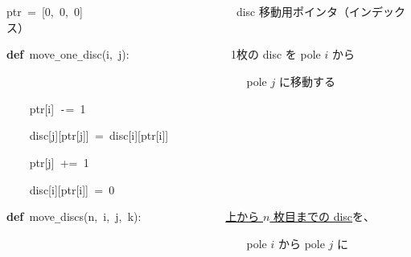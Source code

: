\documentclass[a4paper,10pt]{article}
\def\mc{\relax}
\begin{document}
\noindent
\mbox{}\hfill

\noindent
\mbox{}ptr{\tt\mc \ }={\tt\mc \ }[0,{\tt\mc \ }0,{\tt\mc \ }0]{\tt\mc \ }{\tt\mc \ }{\tt\mc \ }{\tt\mc \ }{\tt\mc \ }{\tt\mc \ }{\tt\mc \ }{\tt\mc \ }{\tt\mc \ }{\tt\mc \ }{\tt\mc \ }{\tt\mc \ }{\tt\mc \ }{\tt\mc \ }{\tt\mc \ }{\tt\mc \ }{\tt\mc \ }{\tt\mc \ }{\tt\mc \ }{\tt\mc \ }{\tt\mc \ }{\tt\mc \ }{\tt\mc \ }{\tt\mc \ }{\tt\mc \ }\rm\mc {\tt\#} \ disc 移動用ポインタ（インデックス）\hfill 
\tt\mc 

\noindent
\mbox{}\hfill

\noindent
\mbox{}\textbf{def}{\tt\mc \ }move{\tt\_}one{\tt\_}disc(i,{\tt\mc \ }j):{\tt\mc \ }{\tt\mc \ }{\tt\mc \ }{\tt\mc \ }{\tt\mc \ }{\tt\mc \ }{\tt\mc \ }{\tt\mc \ }{\tt\mc \ }{\tt\mc \ }{\tt\mc \ }{\tt\mc \ }{\tt\mc \ }{\tt\mc \ }{\tt\mc \ }{\tt\mc \ }\rm\mc {\tt\#} \ 1枚の disc を pole $i$ から\hfill 
\tt\mc 

\noindent
\mbox{}{\tt\mc \ }{\tt\mc \ }{\tt\mc \ }{\tt\mc \ }{\tt\mc \ }{\tt\mc \ }{\tt\mc \ }{\tt\mc \ }{\tt\mc \ }{\tt\mc \ }{\tt\mc \ }{\tt\mc \ }{\tt\mc \ }{\tt\mc \ }{\tt\mc \ }{\tt\mc \ }{\tt\mc \ }{\tt\mc \ }{\tt\mc \ }{\tt\mc \ }{\tt\mc \ }{\tt\mc \ }{\tt\mc \ }{\tt\mc \ }{\tt\mc \ }{\tt\mc \ }{\tt\mc \ }{\tt\mc \ }{\tt\mc \ }{\tt\mc \ }{\tt\mc \ }{\tt\mc \ }{\tt\mc \ }{\tt\mc \ }{\tt\mc \ }{\tt\mc \ }{\tt\mc \ }{\tt\mc \ }{\tt\mc \ }{\tt\mc \ }\rm\mc {\tt\#} \ pole $j$ に移動する \hfill 
\tt\mc 

\noindent
\mbox{}{\tt\mc \ }{\tt\mc \ }{\tt\mc \ }{\tt\mc \ }ptr[i]{\tt\mc \ }{\tt -}={\tt\mc \ }1

\noindent
\mbox{}{\tt\mc \ }{\tt\mc \ }{\tt\mc \ }{\tt\mc \ }disc[j][ptr[j]]{\tt\mc \ }={\tt\mc \ }disc[i][ptr[i]]

\noindent
\mbox{}{\tt\mc \ }{\tt\mc \ }{\tt\mc \ }{\tt\mc \ }ptr[j]{\tt\mc \ }+={\tt\mc \ }1

\noindent
\mbox{}{\tt\mc \ }{\tt\mc \ }{\tt\mc \ }{\tt\mc \ }disc[i][ptr[i]]{\tt\mc \ }={\tt\mc \ }0

\noindent
\mbox{}\hfill

\noindent
\mbox{}\textbf{def}{\tt\mc \ }move{\tt\_}discs(n,{\tt\mc \ }i,{\tt\mc \ }j,{\tt\mc \ }k):{\tt\mc \ }{\tt\mc \ }{\tt\mc \ }{\tt\mc \ }{\tt\mc \ }{\tt\mc \ }{\tt\mc \ }{\tt\mc \ }{\tt\mc \ }{\tt\mc \ }{\tt\mc \ }{\tt\mc \ }{\tt\mc \ }\rm\mc {\tt\#} \ \underline{\textsf{上から $n$ 枚目までの disc}}を、\hfill 
\tt\mc 

\noindent
\mbox{}{\tt\mc \ }{\tt\mc \ }{\tt\mc \ }{\tt\mc \ }{\tt\mc \ }{\tt\mc \ }{\tt\mc \ }{\tt\mc \ }{\tt\mc \ }{\tt\mc \ }{\tt\mc \ }{\tt\mc \ }{\tt\mc \ }{\tt\mc \ }{\tt\mc \ }{\tt\mc \ }{\tt\mc \ }{\tt\mc \ }{\tt\mc \ }{\tt\mc \ }{\tt\mc \ }{\tt\mc \ }{\tt\mc \ }{\tt\mc \ }{\tt\mc \ }{\tt\mc \ }{\tt\mc \ }{\tt\mc \ }{\tt\mc \ }{\tt\mc \ }{\tt\mc \ }{\tt\mc \ }{\tt\mc \ }{\tt\mc \ }{\tt\mc \ }{\tt\mc \ }{\tt\mc \ }{\tt\mc \ }{\tt\mc \ }{\tt\mc \ }\rm\mc {\tt\#} \ pole $i$ から pole $j$ に\hfill 
\tt\mc 
\end{document}
